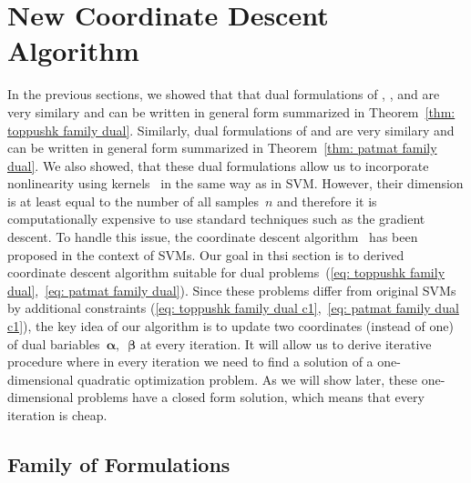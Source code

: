 \section{New Coordinate Descent Algorithm}\label{sec: coordinate descent}

In the previous sections, we showed that that dual formulations of \TopPush, \TopPushK, \TopMeanK and \tauFPL are very similary and can be written in general form summarized in Theorem~\ref{thm: toppushk family dual}. Similarly, dual formulations of \PatMat and \PatMatNP are very similary and can be written in general form summarized in Theorem~\ref{thm: patmat family dual}. We also showed, that these dual formulations  allow us to incorporate nonlinearity using kernels~\cite{scholkopf2001learning} in the same way as in SVM. However, their dimension is at least equal to the number of all samples~$n$ and therefore it is computationally expensive to use standard techniques such as the gradient descent. To handle this issue, the coordinate descent algorithm~\cite{chang2008coordinate,hsieh2008dual} has been proposed in the context of SVMs. Our goal in thsi section is to derived coordinate descent algorithm suitable for dual problems~(\ref{eq: toppushk family dual},~\ref{eq: patmat family dual}). Since these problems differ from original SVMs by additional constraints (\ref{eq: toppushk family dual c1},~\ref{eq: patmat family dual c1}), the key idea of our algorithm is to update two coordinates (instead of one) of dual bariables~$\bm{\alpha},$~$\bm{\beta}$ at every iteration. It will allow us to derive iterative procedure where in every iteration we need to find a solution of a one-dimensional quadratic optimization problem. As we will show later, these one-dimensional problems have a closed form solution, which means that every iteration is cheap.

\subsection{Family of \TopPushK Formulations}

